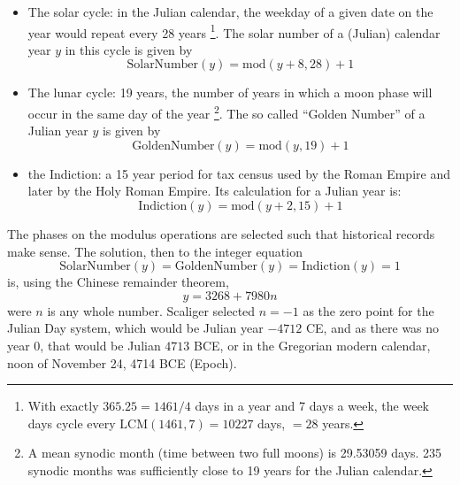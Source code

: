 	\begin{itemize}
		\item The solar cycle: in the Julian calendar, the weekday of a given date on the year would repeat every 28 years 
			\footnote{With exactly $365.25 = 1461/4$ days in a year and 7 days a week, the week days cycle every $\text{LCM}(1461,7)=10227$ days, $=28$ years.}. 
			The solar number of a (Julian) calendar year $y$ in this cycle is given by
			\begin{equation}
				\text{SolarNumber}(y) = \text{mod}(y+8,28) + 1
			\end{equation}
			
		\item The lunar cycle: 19 years, the number of years in which a moon phase will occur in the same day of the year
			\footnote{A mean synodic month (time between two full moons) is 29.53059 days. 235 synodic months was sufficiently close to 19 years for the Julian calendar.}.
			The so called \enquote{Golden Number} of a Julian year $y$ is given by 
			\begin{equation}
				\text{GoldenNumber}(y) = \text{mod}(y,19)+ 1
			\end{equation}
			
		\item the Indiction: a 15 year period for tax census used by the Roman Empire and later by the Holy Roman Empire. Its calculation for a Julian year is:
			\begin{equation}
				\text{Indiction}(y) = \text{mod}(y+2,15) + 1
			\end{equation}
	\end{itemize}
	
	The phases on the modulus operations are selected such that historical records make sense. The solution, then to the integer equation 
	\begin{equation}
		\text{SolarNumber}(y) = \text{GoldenNumber}(y) = \text{Indiction}(y) = 1
	\end{equation}
	is, using the Chinese remainder theorem,
	\begin{equation}
		y = 3268 + 7980 n
	\end{equation}
	were $n$ is any whole number. Scaliger selected $n=-1$ as the zero point for the Julian Day system, which would be Julian year $-4712$ CE, 
	and as there was no year 0, that would be Julian $4713$ BCE, or in the Gregorian modern calendar, noon of November 24, 4714 BCE (Epoch).
	
	
